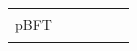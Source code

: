 \begin{landscape}
\begin{longtable}{|l|l|l|l|l|l|}
		pBFT                       & \begin{tabular}[c]{@{}l@{}} \end{tabular}

\end{longtable}
\end{landscape}
